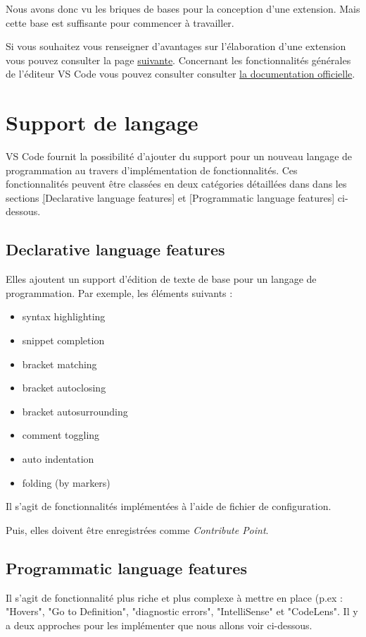 \documentclass[
    iict, %
    il, %
]{heig-tb}
\begin{document}
Nous avons donc vu les briques de bases pour la conception d'une extension. Mais cette base est suffisante pour commencer à travailler.

Si vous souhaitez vous renseigner d'avantages sur l'élaboration d'une extension vous pouvez consulter la page \href{https://code.visualstudio.com/api}{suivante}.
Concernant les fonctionnalités générales de l'éditeur VS Code vous pouvez consulter consulter \href{https://code.visualstudio.com/docs}{la documentation officielle}.

\section{Support de langage}
VS Code fournit la possibilité d'ajouter du support pour un nouveau langage de programmation au travers d'implémentation de fonctionnalités. Ces fonctionnalités peuvent être classées en deux catégories détaillées
dans dans les sections \hyperref[Declarative language features][Declarative language features] et \hyperref[Programmatic language features][Programmatic language features] ci-dessous.

\subsection{Declarative language features}\label{Declarative language features}
Elles ajoutent un support d'édition de texte de base pour un langage de programmation.
Par exemple, les éléments suivants :

\begin{itemize}
    \item syntax highlighting
    \item snippet completion
    \item bracket matching
    \item bracket autoclosing
    \item bracket autosurrounding
    \item comment toggling
    \item auto indentation
    \item folding (by markers)
\end{itemize}

Il s'agit de fonctionnalités implémentées à l'aide de fichier de configuration.

Puis, elles doivent être enregistrées comme \emph{Contribute Point}.

\subsection{Programmatic language features}\label{Programmatic language features}
Il s'agit de fonctionnalité plus riche et plus complexe à mettre en place (p.ex : "Hovers", "Go to Definition", "diagnostic errors", "IntelliSense" \space et "CodeLens".
Il y a deux approches pour les implémenter que nous allons voir ci-dessous.
\end{document}
